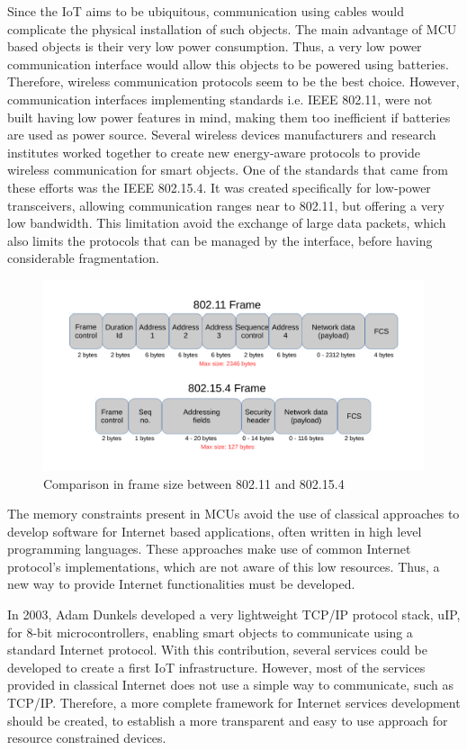 Since the IoT aims to be ubiquitous, communication using cables would complicate the physical installation of such objects.
The main advantage of MCU based objects is their very low power consumption.
Thus, a very low power communication interface would allow this objects to be powered using batteries.
Therefore, wireless communication protocols seem to be the best choice.
However, communication interfaces implementing standards i.e. IEEE 802.11, were not built having low power features in mind, making them too inefficient if batteries are used as power source.
Several wireless devices manufacturers and research institutes worked together to create new energy-aware protocols to provide wireless communication for smart objects.
One of the standards that came from these efforts was the IEEE 802.15.4\cite{ieee802.15.4}.
It was created specifically for low-power transceivers, allowing communication ranges near to 802.11, but offering a very low bandwidth.
This limitation avoid the exchange of large data packets, which also limits the protocols that can be managed by the interface, before having considerable fragmentation.

\begin{figure}[htb]
	\centering
	\includegraphics[width=1\columnwidth]{chapters/background.images/FramesComparison.pdf}
	\caption{Comparison in frame size between 802.11 and 802.15.4}
	\label{fig:FramesComparison}
\end{figure}

The memory constraints present in MCUs avoid the use of classical approaches to develop software for Internet based applications, often written in high level programming languages.
These approaches make use of common Internet protocol's implementations, which are not aware of this low resources.
Thus, a new way to provide Internet functionalities must be developed.

In 2003, Adam Dunkels developed a very lightweight TCP/IP protocol stack, uIP\cite{dunkels03full}, for 8-bit microcontrollers, enabling smart objects to communicate using a standard Internet protocol.
With this contribution, several services could be developed to create a first IoT infrastructure.
However, most of the services provided in classical Internet does not use a simple way to communicate, such as TCP/IP.
Therefore, a more complete framework for Internet services development should be created, to establish a more transparent and easy to use approach for resource constrained devices.

